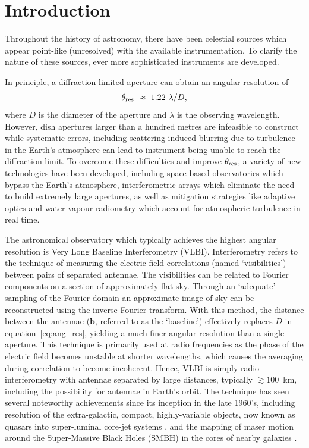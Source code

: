 \chapter{Introduction}

Throughout the history of astronomy, there have been celestial sources which appear point-like (unresolved) with the available instrumentation. To clarify the nature of these sources, ever more sophisticated instruments are developed. 

In principle, a diffraction-limited aperture can obtain an angular resolution of
\begin{equation}\label{eq:ang_res}
 \theta_{\rm res}\ \approx \ 1.22\ \lambda / D,
\end{equation}
where $D$ is the diameter of the aperture and $\lambda$ is the observing wavelength. However, dish apertures larger than a hundred metres are infeasible to construct while systematic errors, including scattering-induced blurring due to turbulence in the Earth's atmosphere can lead to instrument being unable to reach the diffraction limit. To overcome these difficulties and improve $\theta_{\rm res}$, a variety of new technologies have been developed, including space-based observatories which bypass the Earth's atmosphere, interferometric arrays which eliminate the need to build extremely large apertures, as well as mitigation strategies like adaptive optics and water vapour radiometry which account for atmospheric turbulence in real time.  


The astronomical observatory which typically achieves the highest angular resolution is Very Long Baseline Interferometry (VLBI). Interferometry  refers to the technique of measuring the electric field correlations (named `visibilities') between pairs of separated antennae. The visibilities can be related to Fourier components on a section of approximately flat sky. Through an `adequate' sampling of the Fourier domain an approximate image of sky can be reconstructed using the inverse Fourier transform. With this method, the distance between the antennae ($\bm{b}$, referred to as the `baseline') effectively replaces $D$ in equation~\ref{eq:ang_res}, yielding a much finer angular resolution than a single aperture. This technique is primarily used at radio frequencies as the phase of the electric field becomes unstable at shorter wavelengths, which causes the averaging during correlation to become incoherent. Hence, VLBI is simply radio interferometry with antennae separated by large distances, typically $\gtrsim 100$~km, including the possibility for antennae in Earth's orbit. The technique has seen several noteworthy achievements since its inception in the late 1960's, including resolution of the extra-galactic, compact, highly-variable objects, now known as quasars into super-luminal core-jet systems \citep[e.g.][]{Whitney_1971}, and the mapping of maser motion around the Super-Massive Black Holes (SMBH) in the cores of nearby galaxies \citep[e.g.][]{Miyoshi_1995}.

